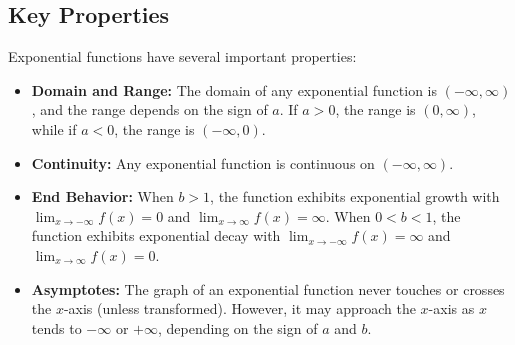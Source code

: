 \documentclass[11pt]{article}
\begin{document}
\begin{center}
\hspace{3em}
\end{center}

\subsection{Key Properties}

Exponential functions have several important properties:

\begin{itemize}
  \item \textbf{Domain and Range:} The domain of any exponential function is $(-\infty, \infty)$, and the range depends on the sign of $a$. If $a > 0$, the range is $(0, \infty)$, while if $a < 0$, the range is $(-\infty, 0)$.
  \item \textbf{Continuity:} Any exponential function is continuous on $(-\infty, \infty)$.
  \item \textbf{End Behavior:} When $b > 1$, the function exhibits exponential growth with $\lim_{x \to -\infty} f(x) = 0$ and $\lim_{x \to \infty} f(x) = \infty$. When $0 < b < 1$, the function exhibits exponential decay with $\lim_{x \to -\infty} f(x) = \infty$ and $\lim_{x \to \infty} f(x) = 0$.
  \item \textbf{Asymptotes:} The graph of an exponential function never touches or crosses the $x$-axis (unless transformed). However, it may approach the $x$-axis as $x$ tends to $-\infty$ or $+\infty$, depending on the sign of $a$ and $b$.
\end{itemize}
\end{document}
